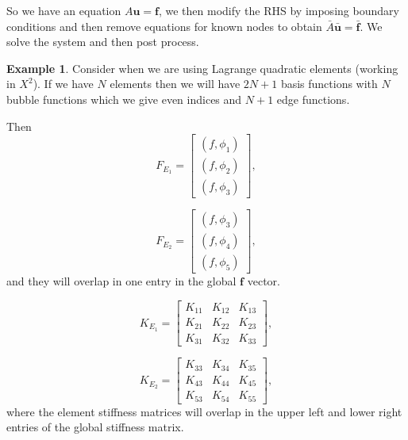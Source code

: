 \documentclass[12pt, a4paper]{article}
\renewcommand{\vec}[1]{\mathbf{#1}}
\theoremstyle{definition}
\newtheorem{example}[thm]{Example}
\theoremstyle{remark}
\numberwithin{equation}{section}
\begin{document}
So we have an equation $A\vec{u}=\vec{f}$, we then modify the RHS by imposing boundary conditions and then remove equations for known nodes to obtain $\bar{A}\bar{\vec{u}}=\bar{\vec{f}}$. We solve the system and then post process.

\begin{example}
Consider when we are using Lagrange quadratic elements (working in $X^2$). If we have $N$ elements then we will have $2N+1$ basis functions with $N$ bubble functions which we give even indices and $N+1$ edge functions.

Then 
\begin{equation*}
F_{E_1}=
\begin{bmatrix}
( f,\phi_1 )\\
( f,\phi_2 )\\
( f,\phi_3 )
\end{bmatrix},
\end{equation*}

\begin{equation*}
F_{E_2}=
\begin{bmatrix}
( f,\phi_3 )\\
( f,\phi_4 )\\
( f,\phi_5 )
\end{bmatrix},
\end{equation*}
and they will overlap in one entry in the global $\vec{f}$ vector.


\begin{equation*}
K_{E_1}=
\begin{bmatrix}
K_{11} & K_{12} & K_{13}\\
K_{21} & K_{22} & K_{23}\\
K_{31} & K_{32} & K_{33}
\end{bmatrix},
\end{equation*}

\begin{equation*}
K_{E_2}=
\begin{bmatrix}
K_{33} & K_{34} & K_{35}\\
K_{43} & K_{44} & K_{45}\\
K_{53} & K_{54} & K_{55}
\end{bmatrix},
\end{equation*}
where the element stiffness matrices will overlap in the upper left and lower right entries of the global stiffness matrix.
\end{example} 
\newpage
\end{document}
